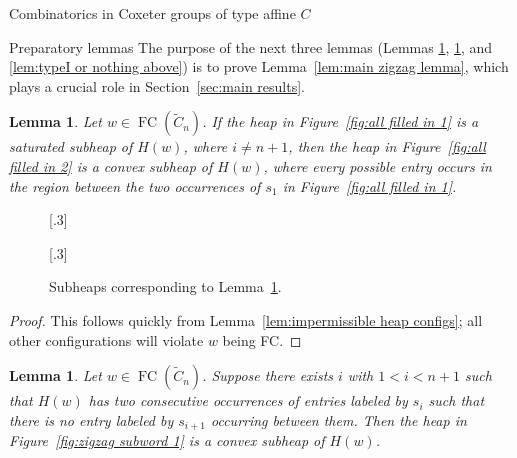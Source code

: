 \documentclass[11pt]{amsart}
\newtheorem{lemma}[theorem]{Lemma}
\theoremstyle{definition}
\numberwithin{equation}{section}
\newcommand{\C}{\widetilde{C}}
\renewcommand{\(}{\left(}
\renewcommand{\)}{\right)}
\DeclareMathOperator{\FC}{FC}
\newcommand\xxaxis{0}
\newcommand\yyaxis{90}
\newcommand\heapblock[3]{\fill[draw=black, fill=gray!30, rounded corners, line width=1.1pt, shift={(\xxaxis:#1)},shift={(\yyaxis:#2)}] (-1,-0.5) rectangle (1,0.5);\node at (#1,#2) {$#3$};}
\begin{document}
\begin{section}{Combinatorics in Coxeter groups of type affine $C$}
\begin{subsection}{Preparatory lemmas}
The purpose of the next three lemmas (Lemmas \ref{lem:all filled in}, \ref{lem:zigzag subword}, and \ref{lem:typeI or nothing above}) is to prove Lemma~\ref{lem:main zigzag lemma}, which plays a crucial role in Section~\ref{sec:main results}.

\begin{lemma}\label{lem:all filled in}
Let $w \in \FC(\C_{n})$.  If the heap in Figure~\ref{fig:all filled in 1} is a saturated subheap of $H(w)$, where $i \neq n+1$, then the heap in Figure~\ref{fig:all filled in 2} is a convex subheap of $H(w)$, where every possible entry occurs in the region between the two occurrences of $s_1$ in Figure~\ref{fig:all filled in 1}.
\end{lemma}

\begin{figure}[!ht]
\subcaptionbox{\label{fig:all filled in 1}}[.3\textwidth]{
}
\subcaptionbox{\label{fig:all filled in 2}}[.3\textwidth]{
}
\caption{Subheaps corresponding to Lemma~\ref{lem:all filled in}.}\label{fig:all filled in}
\end{figure}

\begin{proof}
This follows quickly from Lemma~\ref{lem:impermissible heap configs}; all other configurations will violate $w$ being FC.
\end{proof}

\begin{lemma}\label{lem:zigzag subword}
Let $w \in \FC(\C_{n})$.  Suppose there exists $i$ with $1<i < n+1$ such that $H(w)$ has two consecutive occurrences of entries labeled by $s_{i}$ such that there is no entry labeled by $s_{i+1}$ occurring between them.  Then the heap in Figure~\ref{fig:zigzag subword 1} is a convex subheap of $H(w)$.
\end{lemma}


\end{subsection}
\end{section}
\end{document}
